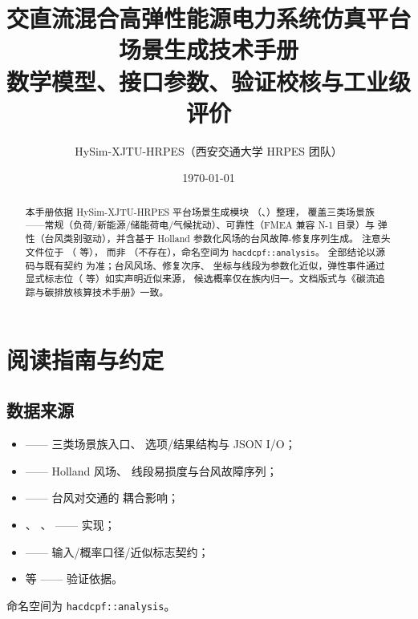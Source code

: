 \documentclass[UTF8,fontset=fandol,a4paper,11pt]{ctexart}
\title{\textbf{交直流混合高弹性能源电力系统仿真平台}\\[0.5em]
       {\Large 场景生成技术手册}\\[0.3em]
       {\large 数学模型、接口参数、验证校核与工业级评价}}
\author{HySim-XJTU-HRPES（西安交通大学 HRPES 团队）}
\date{\today}
\begin{document}
\maketitle
\begin{abstract}
\noindent 本手册依据 HySim-XJTU-HRPES 平台场景生成模块
（、）整理，
覆盖三类场景族——常规（负荷/新能源/储能荷电/气候扰动）、可靠性（FMEA 兼容 N-1 目录）与
弹性（台风类别驱动），并含基于 Holland 参数化风场的台风故障-修复序列生成。
注意头文件位于 （ 等），
而非 （不存在），命名空间为 \texttt{hacdcpf::analysis}。
全部结论以源码与既有契约  为准；台风风场、修复次序、
坐标与线段为参数化近似，弹性事件通过显式标志位（ 等）如实声明近似来源，
候选概率仅在族内归一。文档版式与《碳流追踪与碳排放核算技术手册》一致。
\end{abstract}

\tableofcontents
\newpage

\section{阅读指南与约定}
\subsection{数据来源}
\begin{itemize}
  \item {} —— 三类场景族入口、
        选项/结果结构与 JSON I/O；
  \item {} —— Holland 风场、
        线段易损度与台风故障序列；
  \item {} —— 台风对交通的
        耦合影响；
  \item {}、
        、 —— 实现；
  \item {} —— 输入/概率口径/近似标志契约；
  \item {} 等 —— 验证依据。
\end{itemize}
命名空间为 \texttt{hacdcpf::analysis}。
\end{document}
